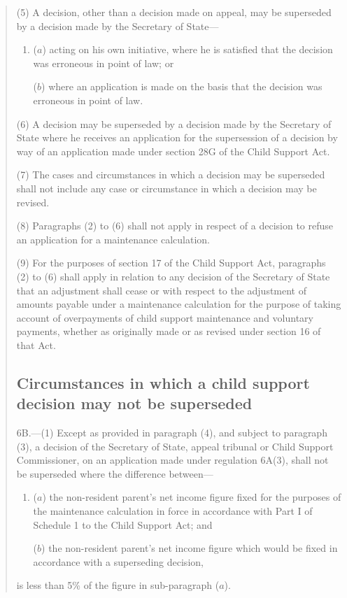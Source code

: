 \documentclass[12pt,a4paper]{article}
\begin{document}
\begin{quotation}
(5) A decision, other than a decision made on appeal, may be superseded by a decision made by the Secretary of State—
\begin{enumerate}\item[]
($a$) acting on his own initiative, where he is satisfied that the decision was erroneous in point of law; or

($b$) where an application is made on the basis that the decision was erroneous in point of law.
\end{enumerate}

(6) A decision may be superseded by a decision made by the Secretary of State where he receives an application for the supersession of a decision by way of an application made under section 28G of the Child Support Act.

(7) The cases and circumstances in which a decision may be superseded shall not include any case or circumstance in which a decision may be revised.

(8) Paragraphs (2) to (6) shall not apply in respect of a decision to refuse an application for a maintenance calculation.

(9) For the purposes of section 17 of the Child Support Act, paragraphs (2) to (6) shall apply in relation to any decision of the Secretary of State that an adjustment shall cease or with respect to the adjustment of amounts payable under a maintenance calculation for the purpose of taking account of overpayments of child support maintenance and voluntary payments, whether as originally made or as revised under section 16 of that Act.

\subsection*{Circumstances in which a child support decision may not be superseded}

6B.---(1)  Except as provided in paragraph (4), and subject to paragraph (3), a decision of the Secretary of State, appeal tribunal or Child Support Commissioner, on an application made under regulation 6A(3), shall not be superseded where the difference between—
\begin{enumerate}\item[]
($a$) the non-resident parent’s net income figure fixed for the purposes of the maintenance calculation in force in accordance with Part I of Schedule 1 to the Child Support Act; and

($b$) the non-resident parent’s net income figure which would be fixed in accordance with a superseding decision,
\end{enumerate}
is less than 5\% of the figure in sub-paragraph ($a$).


\end{quotation}
\end{document}
